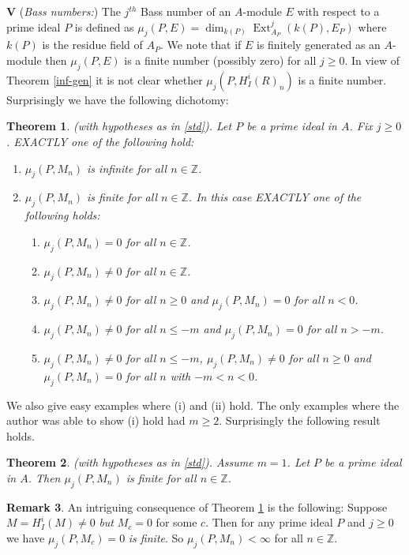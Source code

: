 \documentclass{amsart}
\newcommand{\ZZ}{\mathbb{Z} }
\newcommand{\Ext}{\operatorname{Ext}}
\theoremstyle{plain}
\newtheorem{theorem}{Theorem}[section]
\theoremstyle{definition}
\newtheorem{remark}[theorem]{Remark}
\theoremstyle{remark}
\begin{document}
\textbf{V} (\textit{Bass numbers:}) The $j^{th}$ Bass number of an $A$-module $E$ with respect to a prime ideal $P$ is defined as $\mu_j(P,E) = \dim_{k(P)} \Ext^j_{A_P}(k(P), E_P)$ where $k(P)$ is the residue field of $A_P$. We note that if $E$ is finitely generated as an $A$-module  then $\mu_j(P,E)$ is a finite number (possibly zero) for all $j \geq 0$. In view of Theorem \ref{inf-gen} it is not clear whether $\mu_j(P, H^i_I(R)_n)$ is a finite number. Surprisingly  we have the following dichotomy:
\begin{theorem}
\label{bass-basic}(with hypotheses as in \ref{std}).  Let $P$ be a prime ideal in $A$. Fix $j \geq 0$. EXACTLY one of the following hold:
\begin{enumerate}[\rm(i)]
\item
$\mu_j(P, M_n)$ is infinite for all $n \in \ZZ$.
\item
$\mu_j(P, M_n)$ is finite for all $n \in \ZZ$. In this case EXACTLY one of the following holds:
\begin{enumerate}[\rm (a)]
\item
$\mu_j(P, M_n) = 0$ for all $n \in \ZZ$.
\item
$\mu_j(P, M_n) \neq 0$ for all $n \in \ZZ$.
\item
$\mu_j(P, M_n) \neq 0$ for all $n  \geq 0$ and $\mu_j(P, M_n) = 0$ for all 
$n < 0$.
\item
$\mu_j(P, M_n) \neq 0$ for all $n  \leq -m$ and $\mu_j(P, M_n) = 0$ for all 
$n > -m$.
\item
$\mu_j(P, M_n) \neq 0$ for all $n  \leq -m$, $\mu_j(P, M_n) \neq 0$ for all $n  \geq 0$  and $\mu_j(P, M_n)  = 0$ for all $n$ with $-m < n < 0$.
\end{enumerate}
\end{enumerate}
\end{theorem}
We also give easy examples where (i) and (ii) hold.  The only examples where the author was able to show (i) hold had $m \geq 2$.  Surprisingly  the following result holds.
\begin{theorem}
\label{bass-m-one}(with hypotheses as in \ref{std}).  Assume $m = 1$. Let $P$ be a prime ideal in $A$.  Then 
$\mu_j(P, M_n)$ is finite for all $n \in \ZZ$.
\end{theorem}
\begin{remark}\label{intr}
An intriguing consequence of Theorem \ref{bass-basic} is the following: Suppose
$M = H^i_I(M) \neq 0$ \emph{but} $M_c = 0$ for some $c$. Then for any prime ideal $P$ and $j \geq 0$ we have $\mu_j(P, M_c) = 0$ \emph{is finite}. So $\mu_j(P, M_n) < \infty$ for all $n \in \ZZ$.
\end{remark}
\end{document}
